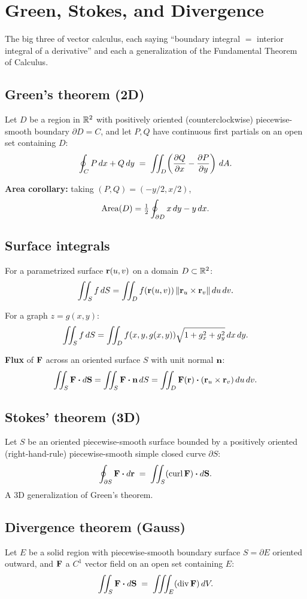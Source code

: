 \section{Green, Stokes, and Divergence}

The big three of vector calculus, each saying ``boundary integral $=$ interior integral of a derivative'' and each a generalization of the Fundamental Theorem of Calculus.

\subsection{Green's theorem (2D)}
Let $D$ be a region in $\mathbb{R}^2$ with positively oriented (counterclockwise) piecewise-smooth boundary $\partial D = C$, and let $P, Q$ have continuous first partials on an open set containing $D$:
\[ \oint_C P \,dx + Q \,dy \;=\; \iint_D \!\left( \frac{\partial Q}{\partial x} - \frac{\partial P}{\partial y} \right) \,dA. \]

\textbf{Area corollary:} taking $(P,Q) = (-y/2, x/2)$,
\[ \text{Area}(D) = \tfrac{1}{2} \oint_{\partial D} x \,dy - y \,dx. \]

\subsection{Surface integrals}
For a parametrized surface $\mathbf{r}(u, v)$ on a domain $D \subset \mathbb{R}^2$:
\[ \iint_S f \,dS = \iint_D f(\mathbf{r}(u,v)) \, \lVert \mathbf{r}_u \times \mathbf{r}_v \rVert \,du \,dv. \]

For a graph $z = g(x,y)$:
\[ \iint_S f \,dS = \iint_D f(x, y, g(x,y)) \sqrt{1 + g_x^2 + g_y^2} \,dx \,dy. \]

\textbf{Flux} of $\mathbf{F}$ across an oriented surface $S$ with unit normal $\mathbf{n}$:
\[ \iint_S \mathbf{F} \boldsymbol\cdot d\mathbf{S} = \iint_S \mathbf{F} \boldsymbol\cdot \mathbf{n} \,dS = \iint_D \mathbf{F}(\mathbf{r}) \boldsymbol\cdot (\mathbf{r}_u \times \mathbf{r}_v) \,du \,dv. \]

\subsection{Stokes' theorem (3D)}
Let $S$ be an oriented piecewise-smooth surface bounded by a positively oriented (right-hand-rule)
piecewise-smooth simple closed curve $\partial S$:
\[ \oint_{\partial S} \mathbf{F} \boldsymbol\cdot d\mathbf{r} \;=\; \iint_S (\operatorname{curl} \mathbf{F}) \boldsymbol\cdot d\mathbf{S}. \]
A 3D generalization of Green's theorem.

\subsection{Divergence theorem (Gauss)}
Let $E$ be a solid region with piecewise-smooth boundary surface $S = \partial E$ oriented
outward, and $\mathbf{F}$ a $C^1$ vector field on an open set containing $E$:
\[ \iint_{S} \mathbf{F} \boldsymbol\cdot d\mathbf{S} \;=\; \iiint_E (\operatorname{div} \mathbf{F}) \,dV. \]

